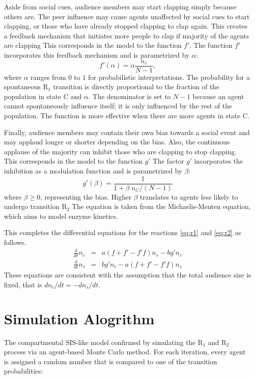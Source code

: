 Aside from social cues, audience members may start clapping simply because others are.
The peer influence may cause agents unaffected by social cues to start clapping, or those who have already stopped clapping to clap again.
This creates a feedback mechanism that initiates more people to clap if majority of the agents are clapping
This corresponds in the model to the function $f'$.
The function $f'$ incorporates this feedback mechanism and is parametrized by $\alpha$:
\begin{equation}\label{eq:f'}
  f'(\alpha) = \alpha \frac{n_c}{N-1},
\end{equation}
where $\alpha$ ranges from $0$ to $1$ for probabilistic interpretations.
The probability for a spontaneous $\mathrm{R}_{1}$ transition is directly proportional to the fraction of the population in state C and $\alpha$. The denominator is set to $N-1$ because an agent cannot spontaneously influence itself; it is only influenced by the rest of the population.
The function is more effective when there are more agents in state C.

Finally, audience members may contain their own bias towards a social event and may applaud longer or shorter depending on the bias.
Also, the continuous applause of the majority can inhibit those who are clapping to stop clapping.
This corresponds in the model to the function $g'$
The factor $g'$ incorporates the inhibition as a modulation function and is parametrized by $\beta$: 
\begin{equation}\label{eq:g'}
  g'(\beta) = \frac{1}{1 + \beta\;n_C /(N-1)}
\end{equation}
where $\beta \geq 0$, representing the bias.
Higher $\beta$ translates to agents less likely to undergo transition $\mathrm{R}_{2}$ 
The equation is taken from the Michaelis-Menten equation, which aims to model enzyme kinetics\cite{michaelisconstant}.

This completes the differential equations for the reactions \eqref{eq:r1} and \eqref{eq:r2} as follows.
\begin{eqnarray}
\frac{d}{dt}n_{c} &=& a (f+f'-f'f) n_{s} - b g' n_{c}\label{eq:diff1} \\
\frac{d}{dt}n_{s} &=& b g' n_{c} - a (f+f'-f'f) n_{s}\label{eq:diff2}
\end{eqnarray}
These equations are consistent with the assumption that the total audience size is fixed, that is $dn_{c}/dt = -dn_{s}/dt$.

\section{Simulation Alogrithm}
\hspace{\parindent} The compartmental SIS-like model confirmed by simulating the $\mathrm{R}_{1}$ and $\mathrm{R}_{2}$ process via an agent-based Monte Carlo method. For each iteration, every agent is assigned a random number that is compared to one of the transition probabilities:

